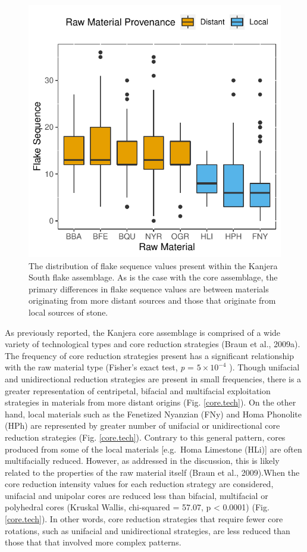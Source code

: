 \documentclass[]{elsarticle} %
\makeatletter
\def\maxwidth{\ifdim\Gin@nat@width>\linewidth\linewidth
\else\Gin@nat@width\fi}
\let\Oldincludegraphics\includegraphics
\renewcommand{\includegraphics}[1]{\Oldincludegraphics[width=\maxwidth]{#1}}
\makeatother
\begin{document}
\begin{figure}
\centering
\includegraphics{HUMEV-D-20-00115_revised_draft_files/figure-latex/fig-4-1.pdf}
\caption{The distribution of flake sequence values present within the
Kanjera South flake assemblage. As is the case with the core assemblage,
the primary differences in flake sequence values are between materials
originating from more distant sources and those that originate from
local sources of stone. \label{flake_seq_rm}}
\end{figure}

As previously reported, the Kanjera core assemblage is comprised of a
wide variety of technological types and core reduction strategies (Braun
et al., 2009a). The frequency of core reduction strategies present has a
significant relationship with the raw material type (Fisher's exact
test, \emph{p} = \ensuremath{5\times 10^{-4}} ). Though unifacial and
unidirectional reduction strategies are present in small frequencies,
there is a greater representation of centripetal, bifacial and
multifacial exploitation strategies in materials from more distant
origins (Fig. \ref{core.tech}). On the other hand, local materials such
as the Fenetized Nyanzian (FNy) and Homa Phonolite (HPh) are represented
by greater number of unifacial or unidirectional core reduction
strategies (Fig. \ref{core.tech}). Contrary to this general pattern,
cores produced from some of the local materials {[}e.g.~Homa Limestone
(HLi){]} are often multifacially reduced. However, as addressed in the
discussion, this is likely related to the properties of the raw material
itself (Braun et al., 2009).When the core reduction intensity values for
each reduction strategy are considered, unifacial and unipolar cores are
reduced less than bifacial, multifacial or polyhedral cores (Kruskal
Wallis, chi-squared = 57.07, p \textless{} 0.0001) (Fig.
\ref{core.tech}). In other words, core reduction strategies that require
fewer core rotations, such as unifacial and unidirectional strategies,
are less reduced than those that that involved more complex patterns.
\end{document}
